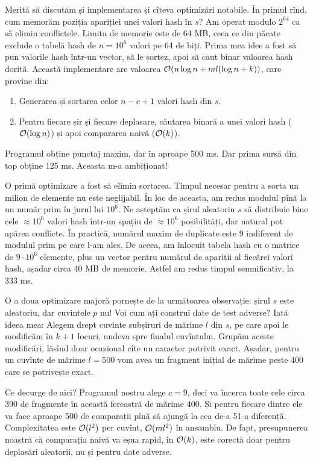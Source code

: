\documentclass[../main.tex]{subfiles}
\begin{document}
Merită să discutăm și implementarea și cîteva optimizări notabile. În primul rînd, cum memorăm poziția apariției unei valori hash în $s$? Am operat modulo $2^{64}$ ca să elimin conflictele. Limita de memorie este de 64 MB, ceea ce din păcate exclude o tabelă hash de $n = 10^6$ valori pe 64 de biți. Prima mea idee a fost să pun valorile hash într-un vector, să le sortez, apoi să caut binar valoarea hash dorită. Această implementare are valoarea $\mathcal{O}(n \log n + ml(\log n + k))$, care provine din:

\begin{enumerate}
  \item Generarea și sortarea celor $n - c + 1$ valori hash din $s$.
  \item Pentru fiecare șir și fiecare deplasare, căutarea binară a unei valori hash ($\mathcal{O}(\log n)$) și apoi compararea naivă ($\mathcal{O}(k)$).
\end{enumerate}

Programul obține punctaj maxim, dar în aproape 500 ms. Dar prima sursă din top obține 125 ms. Aceasta m-a ambiționat! 

O primă optimizare a fost să elimin sortarea. Timpul necesar pentru a sorta un milion de elemente nu este neglijabil. În loc de aceasta, am redus modulul pînă la un număr prim în jurul lui $10^6$. Ne așteptăm ca șirul aleatoriu $s$ să distribuie bine cele $\approx 10^6$ valori hash într-un spațiu de $\approx 10^6$ posibilități, dar natural pot apărea conflicte. În practică, numărul maxim de duplicate este 9 indiferent de modulul prim pe care l-am ales. De aceea, am înlocuit tabela hash cu o matrice de $9 \cdot 10^6$ elemente, plus un vector pentru numărul de apariții al fiecărei valori hash, așadar circa 40 MB de memorie. Astfel am redus timpul semnificativ, la 333 ms.

O a doua optimizare majoră pornește de la următoarea observație: șirul $s$ este aleatoriu, dar cuvintele $p$ nu!  Voi cum ați construi date de test adverse? Iată ideea mea: Alegem drept cuvinte subșiruri de mărime $l$ din $s$, pe care apoi le modificăm în $k+1$ locuri, undeva spre finalul cuvîntului. Grupăm aceste modificări, lăsînd doar ocazional cîte un caracter potrivit exact. Așadar, pentru un cuvînte de mărime $l = 500$ vom avea un fragment inițial de mărime peste 400 care se potrivește exact.

Ce decurge de aici? Programul nostru alege $c=9$, deci va încerca toate cele circa 390 de fragmente în această fereastră de mărime 400. Și pentru fiecare dintre ele va face aproape 500 de comparații pînă să ajungă la cea de-a 51-a diferență. Complexitatea este $\mathcal{O}(l^2)$ per cuvînt, $\mathcal{O}(ml^2)$ în ansamblu. De fapt, presupunerea noastră că comparația naivă va eșua rapid, în $\mathcal{O}(k)$, este corectă doar pentru deplasări aleatorii, nu și pentru date adverse.
\end{document}
